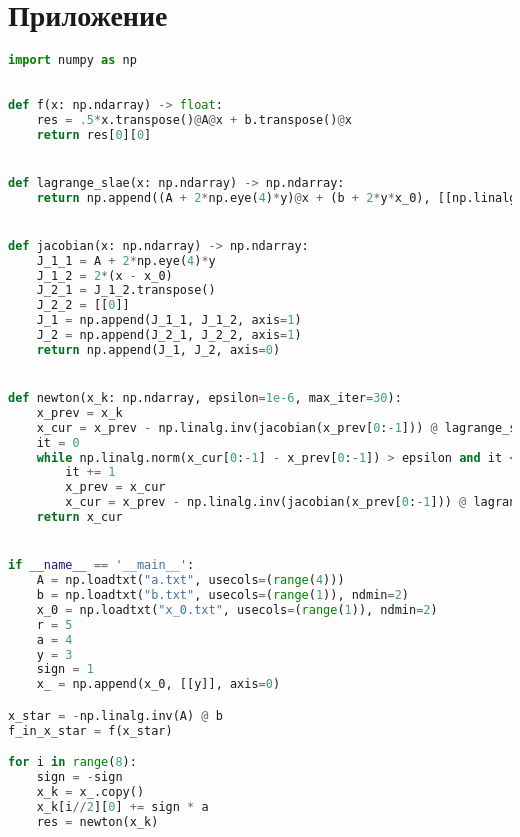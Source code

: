 \documentclass[a4paper, 14pt]{extarticle}
\begin{document}
 	\section{Приложение}
 	\begin{lstlisting}[language=python]
import numpy as np
		
		
def f(x: np.ndarray) -> float:
	res = .5*x.transpose()@A@x + b.transpose()@x
	return res[0][0]


def lagrange_slae(x: np.ndarray) -> np.ndarray:
	return np.append((A + 2*np.eye(4)*y)@x + (b + 2*y*x_0), [[np.linalg.norm(x - x_0)**2 - r**2]], axis=0)


def jacobian(x: np.ndarray) -> np.ndarray:
	J_1_1 = A + 2*np.eye(4)*y
	J_1_2 = 2*(x - x_0)
	J_2_1 = J_1_2.transpose()
	J_2_2 = [[0]]
	J_1 = np.append(J_1_1, J_1_2, axis=1)
	J_2 = np.append(J_2_1, J_2_2, axis=1)
	return np.append(J_1, J_2, axis=0)


def newton(x_k: np.ndarray, epsilon=1e-6, max_iter=30):
	x_prev = x_k
	x_cur = x_prev - np.linalg.inv(jacobian(x_prev[0:-1])) @ lagrange_slae(x_prev[0:-1])
	it = 0
	while np.linalg.norm(x_cur[0:-1] - x_prev[0:-1]) > epsilon and it < max_iter:
		it += 1
		x_prev = x_cur
		x_cur = x_prev - np.linalg.inv(jacobian(x_prev[0:-1])) @ lagrange_slae(x_prev[0:-1])
	return x_cur


if __name__ == '__main__':
	A = np.loadtxt("a.txt", usecols=(range(4)))
	b = np.loadtxt("b.txt", usecols=(range(1)), ndmin=2)
	x_0 = np.loadtxt("x_0.txt", usecols=(range(1)), ndmin=2)
	r = 5
	a = 4
	y = 3
	sign = 1
	x_ = np.append(x_0, [[y]], axis=0)

x_star = -np.linalg.inv(A) @ b
f_in_x_star = f(x_star)

for i in range(8):
	sign = -sign
	x_k = x_.copy()
	x_k[i//2][0] += sign * a
	res = newton(x_k)
 	\end{lstlisting}
		  
\end{document}
